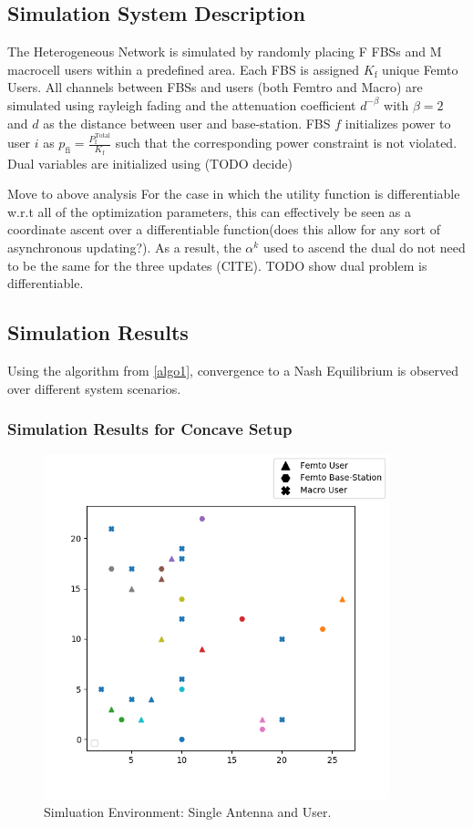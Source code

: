 \documentclass[12pt,a4paper]{report}
\begin{document}
\subsection{Simulation System Description}
The Heterogeneous Network is simulated by randomly placing F FBSs and M macrocell users within a predefined area. Each FBS is assigned $K_{\mathrm{f}}$ unique Femto Users. All channels between FBSs and users (both Femtro and Macro) are simulated using rayleigh fading and the attenuation coefficient $d^{- \beta}$ with $\beta =2$ and $d$ as the distance between user and base-station.
FBS $f$ initializes power to user $i$ as $p_{\mathrm{fi}} = \frac{{P_{\mathrm{f}}^{\text{Total}}}}{K_{\mathrm{f}}} $ such that the corresponding power constraint is not violated. 
Dual variables are initialized using  (TODO decide)
\par
Move to above analysis
For the case in which the utility function is differentiable w.r.t all of the optimization parameters, this can effectively be seen as a coordinate ascent over a differentiable function(does this allow for any sort of asynchronous updating?). As a result, the $\alpha^{k}$ used to ascend the dual do not need to be the same for the three updates (CITE).
TODO show dual problem is differentiable.


\subsection{Simulation Results}
Using the algorithm from \ref{algo1}, convergence to a Nash Equilibrium is observed over different system scenarios. 
\subsubsection{Simulation Results for Concave Setup}

\begin{figure}[H]
	\includegraphics[width=\textwidth,height = 10cm]{figures/system_figure_single}
	  \caption{Simluation Environment: Single Antenna and User.}
\end{figure}
\end{document}
